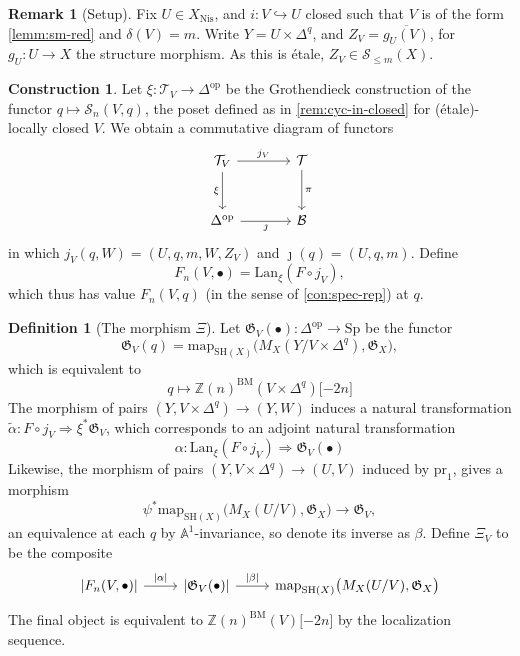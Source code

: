 \documentclass[11pt, twoside]{article}
\numberwithin{equation}{section}
\theoremstyle{definition}
\newtheorem{definition}[equation]{Definition}
\newtheorem{construction}[equation]{Construction}
\newtheorem{remark}[equation]{Remark}
\newcommand{\bb}[1]{\mathbb{#1}}
\newcommand{\mf}[1]{\mathfrak{#1}}
\newcommand{\pr}{\mathrm{pr}}
\newcommand{\map}{\mathrm{map}}
\newcommand{\sh}{\mathrm{SH}}
\newcommand{\Sp}{\mathrm{Sp}}
\newcommand{\bm}{\mathrm{BM}}
\newcommand{\lan}{\mathrm{Lan}}
\newcommand{\nis}{\mathrm{Nis}}
\newcommand{\op}{\mathrm{op}}
\begin{document}
\begin{remark}[Setup]
Fix \(U \in X_\nis\), and \(i \colon V \hookrightarrow U\) closed such that \(V\) is of the form \ref{lemm:sm-red} and \(\delta(V) = m\). Write \(Y = U \times \Delta^q\), and \(Z_V = \overline{g_{U}(V)}\), for \(g_{U} \colon U \to X\) the structure morphism. As this is étale, \(Z_V \in \mathcal{S}_{\leq m}(X)\).
\end{remark}

\begin{construction}
Let \(\xi \colon \mathcal{T}_V \to \Delta^\op\) be the Grothendieck construction of the functor \(q \mapsto \mathcal{S}_n(V, q)\), the poset defined as in \ref{rem:cyc-in-closed} for (étale)-locally closed \(V\). We obtain a commutative diagram of functors 
\begin{equation}\label{eq:intw-fib}
\begin{tikzcd} [row sep = large, column sep = large]
\mathcal{T}_V \ar[d, "\xi", swap] \ar[r, "j_V"] & \mathcal{T} \ar[d, "\pi"]\\
\Delta^\op \ar[r, "\jmath", swap] & \mathcal{B}
\end{tikzcd}
\end{equation}
in which \(j_V(q, W) = (U, q, m, W, Z_V)\) and \(\jmath(q) = (U, q, m)\). Define 
\[F_n(V, \bullet) = \lan_\xi (F \circ j_V),\]
which thus has value \(F_n(V, q)\) (in the sense of \ref{con:spec-rep}) at \(q\).
\end{construction}

\begin{definition}[The morphism \(\Xi\)]
Let \(\mf{G}_V(\bullet) \colon \Delta^\op \to \Sp\) be the functor 
\[\mf{G}_V(q) = \map_{\sh(X)}\big(M_X(Y/V \times \Delta^q), \mf{G}_X\big),\]
which is equivalent to 
\[q \mapsto \bb{Z}(n)^\bm(V \times \Delta^q)\lbrack -2n \rbrack\]
The morphism of pairs \((Y, V \times \Delta^q) \to (Y, W)\) induces a natural transformation \(\tilde{\alpha} \colon F \circ j_V \Longrightarrow \xi^* \mf{G}_V\), which corresponds to an adjoint natural transformation 
\[\alpha \colon \lan_\xi (F \circ j_V) \Longrightarrow \mf{G}_V(\bullet)\]
Likewise, the morphism of pairs \((Y, V \times \Delta^q) \to (U, V)\) induced by \(\pr_1\), gives a morphism 
\[\psi^*\map_{\sh(X)}\big(M_X(U/V), \mf{G}_X) \to \mf{G}_V,\]
an equivalence at each \(q\) by \(\bb{A}^1\)-invariance, so denote its inverse as \(\beta\). Define \(\Xi_V\) to be the composite 
\[\begin{tikzcd}
\lvert F_n(V, \bullet) \rvert \ar[r, "\lvert \alpha \rvert"] & \lvert \mf{G}_V(\bullet) \rvert \ar[r, "\lvert \beta \rvert"] & \map_{\sh(X)}\big(M_X(U/V), \mf{G}_X\big)
\end{tikzcd}\]
The final object is equivalent to \(\bb{Z}(n)^\bm(V)\lbrack -2n \rbrack\) by the localization sequence.
\end{definition}
\end{document}
